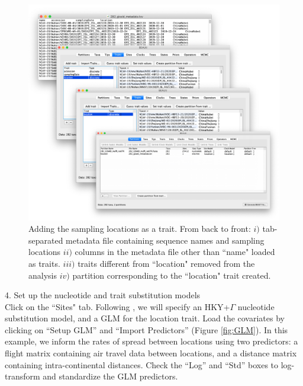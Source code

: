 \documentclass{article}
\begin{document}
\begin{figure}[!ht]
    \centering
    \includegraphics[width=1\textwidth]{figs/location_trait.pdf}
    \caption{Adding the sampling locations as a trait. From back to front: $i)$ tab-separated metadata file containing sequence names and sampling locations $ii)$ columns in the metadata file other than ``name" loaded as traits. $iii)$ traits different from ``location" removed from the analysis $iv)$ partition corresponding to the ``location" trait created.}
    \label{fig:location}
\end{figure}

\clearpage

4. Set up the nucleotide and trait substitution models\\

Click on the ``Sites" tab. Following \cite{travhist}, %
we will specify an HKY+$\Gamma$ nucleotide substitution model, and a GLM for the location trait.
Load the covariates by clicking on ``Setup GLM'' and ``Import Predictors'' (Figure \ref{fig:GLM}). In this example, we inform the rates of spread between locations using two predictors: a flight matrix containing air travel data between locations, and a distance matrix containing intra-continental distances. %
Check the ``Log'' and ``Std'' boxes to log-transform and standardize the GLM predictors.\\
\end{document}
